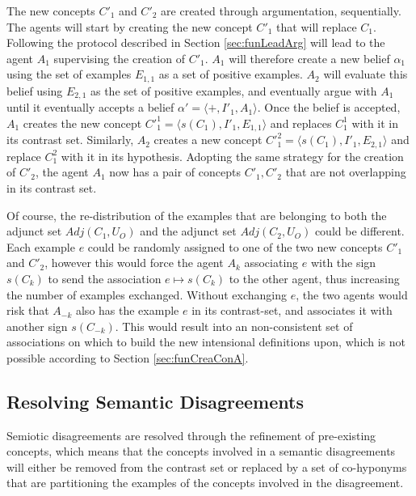 The new concepts $C'_{1}$ and $C'_{2}$ are created through argumentation, sequentially. The agents will start by creating the new concept $C'_{1}$ that will replace $C_{1}$. Following the protocol described in Section \ref{sec:funLeadArg} will lead to the agent $A_{1}$ supervising the creation of $C'_{1}$. $A_{1}$ will therefore create a new belief $\alpha_{1}$ using the set of examples $E_{1,1}$ as a set of positive examples. $A_{2}$ will evaluate this belief using $E_{2,1}$ as the set of positive examples, and eventually argue with $A_{1}$ until it eventually accepts a belief $\alpha' = \langle +, I'_{1}, A_{1} \rangle$. Once the belief is accepted, $A_{1}$ creates the new concept $C'^{1}_{1} = \langle s(C_{1}), I'_{1}, E_{1,1} \rangle$ and replaces $C_{1}^{1}$ with it in its contrast set. Similarly, $A_{2}$ creates a new concept $C'^{2}_{1} = \langle s(C_{1}), I'_{1}, E_{2,1} \rangle$ and replace $C^{2}_{1}$ with it in its hypothesis. Adopting the same strategy for the creation of $C'_{2}$, the agent $A_{1}$ now has a pair of concepts $C'_{1}, C'_{2}$ that are not overlapping in its contrast set.

Of course, the re-distribution of the examples that are belonging to both the adjunct set $Adj(C_{1},U_{O})$ and the adjunct set $Adj(C_{2},U_{O})$ could be different. Each example $e$ could be randomly assigned to one of the two new concepts $C'_{1}$ and $C'_{2}$, however this would force the agent $A_{k}$ associating $e$ with the sign $s(C_{k})$ to send the association $e \mapsto s(C_{k})$ to the other agent, thus increasing the number of examples exchanged. Without exchanging $e$, the two agents would risk that $A_{-k}$ also has the example $e$ in its contrast-set, and associates it with another sign $s(C_{-k})$. This would result into an non-consistent set of associations on which to build the new intensional definitions upon, which is not possible according to Section \ref{sec:funCreaConA}.

\subsection{Resolving Semantic Disagreements}
\label{sec:ResSemDis}

Semiotic disagreements are resolved through the refinement of pre-existing concepts, which means that the concepts involved in a semantic disagreements will either be removed from the contrast set or replaced by a set of co-hyponyms that are partitioning the examples of the concepts involved in the disagreement.


